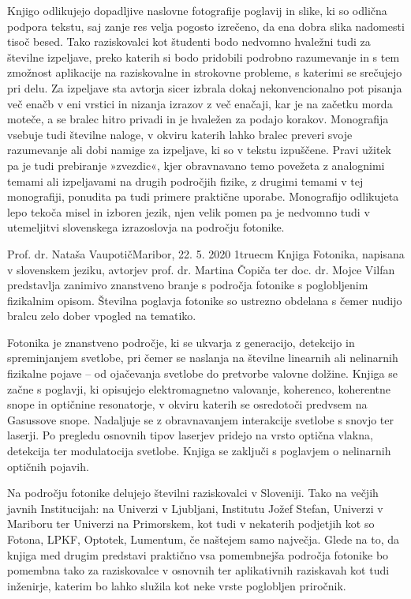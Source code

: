 \documentclass[11pt,fleqn]{book} %
\begin{document}
Knjigo odlikujejo dopadljive naslovne fotografije poglavij in slike, ki so odlična podpora tekstu, saj zanje res velja pogosto izrečeno, da ena dobra slika nadomesti tisoč besed. Tako raziskovalci kot študenti bodo nedvomno hvaležni tudi za številne izpeljave, preko katerih si bodo pridobili podrobno razumevanje in s tem zmožnost aplikacije na raziskovalne in strokovne probleme, s katerimi se srečujejo pri delu. Za izpeljave sta avtorja sicer izbrala dokaj nekonvencionalno pot pisanja več enačb v eni vrstici in nizanja izrazov z več enačaji, kar je na začetku morda moteče, a se bralec hitro privadi in je hvaležen za podajo korakov. Monografija vsebuje tudi številne naloge, v okviru katerih lahko bralec preveri svoje razumevanje ali dobi namige za izpeljave, ki so v tekstu izpuščene. Pravi užitek pa je tudi prebiranje »zvezdic«, kjer obravnavano temo povežeta z analognimi temami ali izpeljavami na drugih področjih fizike, z drugimi temami v tej monografiji, ponudita pa tudi primere praktične uporabe. Monografijo odlikujeta lepo tekoča misel in izboren jezik, njen velik pomen pa je nedvomno tudi v utemeljitvi slovenskega izrazoslovja na področju fotonike.

Prof. dr. Nataša Vaupotič\hfill Maribor, 22. 5. 2020 
\thispagestyle{plain}
\vglue1truecm
Knjiga Fotonika, napisana v slovenskem jeziku, avtorjev prof. dr.
Martina Čopiča ter doc. dr. Mojce Vilfan predstavlja zanimivo znanstveno branje s področja fotonike s poglobljenim fizikalnim opisom. Številna poglavja fotonike so ustrezno obdelana s čemer nudijo bralcu zelo dober vpogled na tematiko.

Fotonika je znanstveno področje, ki se ukvarja z generacijo, detekcijo in spreminjanjem svetlobe, pri čemer se naslanja na številne linearnih ali nelinarnih fizikalne pojave – od ojačevanja svetlobe do pretvorbe valovne dolžine. Knjiga se začne s poglavji, ki opisujejo elektromagnetno valovanje, koherenco, koherentne snope in optičnine resonatorje, v okviru katerih se osredotoči predvsem na Gasussove snope. Nadaljuje se z obravnavanjem interakcije svetlobe s snovjo ter laserji. Po pregledu osnovnih tipov laserjev pridejo na vrsto optična vlakna, detekcija ter modulatocija svetlobe. Knjiga se zaključi s poglavjem o nelinarnih optičnih pojavih.

Na področju fotonike delujejo številni raziskovalci v Sloveniji. Tako na večjih javnih Institucijah: na Univerzi v Ljubljani, Institutu Jožef Stefan, Univerzi v Mariboru ter Univerzi na Primorskem, kot tudi v nekaterih podjetjih kot so Fotona, LPKF, Optotek, Lumentum, če naštejem samo največja. Glede na to, da knjiga med drugim predstavi praktično vsa pomembnejša področja fotonike bo pomembna tako za raziskovalce v osnovnih ter aplikativnih raziskavah kot tudi inženirje, katerim bo lahko služila kot neke vrste poglobljen priročnik.
\end{document}
